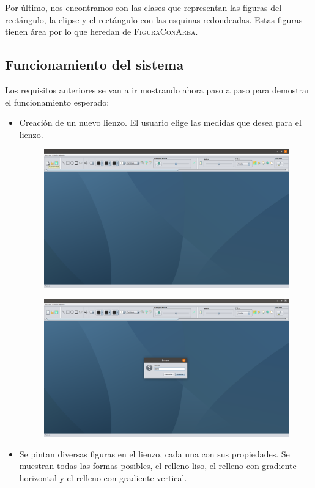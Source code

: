 \documentclass[11pt,a4paper]{article}
\begin{document}
Por último, nos encontramos con las clases que representan las figuras del rectángulo, la elipse y el rectángulo con las esquinas redondeadas. Estas figuras tienen área por lo que heredan de \textsc{FiguraConArea}.

\subsection{Funcionamiento del sistema}
Los requisitos anteriores se van a ir mostrando ahora paso a paso para demostrar el funcionamiento esperado:

\begin{itemize}
	\item Creación de un nuevo lienzo. El usuario elige las medidas que desea para el lienzo.
	\begin{figure}[H]
	\centering
		\includegraphics[scale=0.2]{./img/1.png}
	\end{figure}
	\begin{figure}[H]
	\centering
		\includegraphics[scale=0.2]{./img/2.png}
	\end{figure}
	\item Se pintan diversas figuras en el lienzo, cada una con sus propiedades. Se muestran todas las formas posibles, el relleno liso, el relleno con gradiente horizontal y el relleno con gradiente vertical.

\end{itemize}
\end{document}

